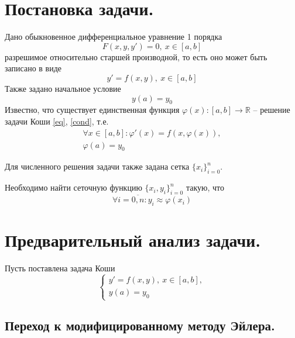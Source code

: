 \documentclass[a4paper, 12pt]{article}
\theoremstyle{mythm}
\begin{document}
	\section{Постановка задачи.}
	
	Дано обыкновенное дифференциальное уравнение 1 порядка
	\begin{equation}
		F(x,y,y')=0,\ x\in[a,b]
	\end{equation}
	разрешимое относительно старшей производной, то есть оно может быть записано в виде
	\begin{equation} \label{eq}
		y'=f(x,y),\ x\in[a,b]
	\end{equation}
	Также задано начальное условие
	\begin{equation} \label{cond}
		y(a)=y_0
	\end{equation}
	Известно, что существует единственная функция $\varphi(x):[a,b]\rightarrow\mathbb{R}$ -- решение задачи Коши \eqref{eq}, \eqref{cond}, т.е.
	\begin{equation}
		\begin{gathered}
			\forall x\in[a,b]: \varphi'(x)=f(x,\varphi(x)),\\
			\varphi(a)=y_0
		\end{gathered}
	\end{equation}

	Для численного решения задачи также задана сетка $\{x_i\}_{i=0}^n$.
	
	Необходимо найти сеточную функцию $\{x_i,y_i\}_{i=0}^n$ такую, что
	\begin{equation}
		\forall i=\overline{0,n}: y_i\approx\varphi(x_i)
	\end{equation}

	\section{Предварительный анализ задачи.}
	
	Пусть поставлена задача Коши 
	\begin{equation} \label{eq:cauchy_task}
		\begin{cases}
			y'=f(x,y),\ x\in[a,b],\\
			y(a)=y_0
		\end{cases}
	\end{equation}
	
	\subsection{Переход к модифицированному методу Эйлера.}
	
\end{document}
